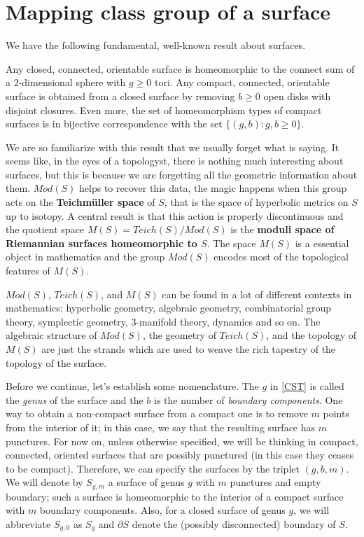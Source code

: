\section{Mapping class group of a surface}

We have the following fundamental, well-known result about surfaces.

\begin{theorem}\label{CST}
Any closed, connected, orientable surface is homeomorphic to the connect sum of a 2-dimensional sphere with $g \geq 0$ tori. Any compact, connected, orientable surface is obtained from a closed surface by removing $b \geq 0 $ open disks with disjoint closures. Even more, the set of homeomorphism types of compact surfaces is in bijective correspondence with the set $\{ (g, b) : g, b \geq 0\}$.
\end{theorem}

We are so familiarize with this result that we usually forget what is saying. It seems like, in the eyes of a topologyst, there is nothing much interesting about surfaces, but this is because we are forgetting all the geometric information about them. $Mod(S)$ helps to recover this data, the magic happens when this group acts on the \textbf{Teichmüller space} of $S$, that is the space of hyperbolic metrics on $S$ up to isotopy. A central result is that this action is properly discontinuous and the quotient space $M(S) = Teich(S)/ Mod(S)$ is the \textbf{moduli space of Riemannian surfaces homeomorphic to $S$}. The space $M(S)$ is a essential object in mathematics and the group $Mod(S)$ encodes most of the topological features of $M(S)$.

$Mod(S)$, $Teich(S)$, and $M(S)$ can be found in a lot of different contexts in mathematics: hyperbolic geometry, algebraic geometry, combinatorial group theory, symplectic geometry, 3-manifold theory, dynamics and so on. The algebraic structure of $Mod(S)$, the geometry of $Teich(S)$, and the topology of $M(S)$ are just the strands which are used to weave the rich tapestry of the topology of the surface.

Before we continue, let's establish some nomenclature. The $g$ in \ref{CST} is called the \textit{genus} of the surface and the $b$ is the number of \textit{boundary components}. One way to obtain a non-compact surface from a compact one is to remove $m$ points from the interior of it; in this case, we say that the resulting surface has $m$ punctures. For now on, unless otherwise specified, we will be thinking in compact, connected, oriented surfaces that are possibly punctured (in this case they ceases to be compact). Therefore, we can specify the surfaces by the triplet $(g, b, m)$. We will denote by $S_{g,m}$ a surface of genus $g$ with $m$ punctures and empty boundary; such a surface is homeomorphic to the interior of a compact surface with $m$ boundary components. Also, for a closed surface of genus $g$, we will abbreviate $S_{g,0}$ as $S_{g}$ and $\partial S$ denote the (possibly disconnected) boundary of $S$.

